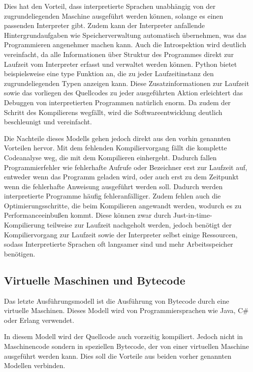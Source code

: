 \documentclass[11pt, parskip=half]{scrartcl}       %
\begin{document}
Dies hat den Vorteil, dass interpretierte Sprachen unabhängig von der zugrundeliegenden Maschine ausgeführt werden können, solange es einen passenden Interpreter gibt.
Zudem kann der Interpreter anfallende Hintergrundaufgaben wie Speicherverwaltung automatisch übernehmen, was das Programmieren angenehmer machen kann.
Auch die Introspektion wird deutlich vereinfacht, da alle Informationen über Struktur des Programmes direkt zur Laufzeit vom Interpreter erfasst und verwaltet werden können.
Python bietet beispielsweise eine type Funktion an, die zu jeder Laufzeitinstanz den zugrundeliegenden Typen anzeigen kann.
Diese Zusatzinformationen zur Laufzeit sowie das vorliegen des Quellcodes zu jeder ausgeführten Aktion erleichtert das Debuggen von interpretierten Programmen natürlich enorm.
Da zudem der Schritt des Kompilierens wegfällt, wird die Softwareentwicklung deutlich beschleunigt und vereinfacht.

Die Nachteile dieses Modells gehen jedoch direkt aus den vorhin genannten Vorteilen hervor.
Mit dem fehlenden Kompiliervorgang fällt die komplette Codeanalyse weg, die mit dem Kompilieren einhergeht.
Dadurch fallen Programmierfehler wie fehlerhafte Aufrufe oder Bezeichner erst zur Laufzeit auf, entweder wenn das Programm geladen wird, oder auch erst zu dem Zeitpunkt wenn die fehlerhafte Anweisung ausgeführt werden soll.
Dadurch werden interpretierte Programme häufig fehleranfälliger.
Zudem fehlen auch die Optimierungsschritte, die beim Kompilieren angewandt werden, wodurch es zu Performanceeinbußen kommt.
Diese können zwar durch Just-in-time-Kompilierung teilweise zur Laufzeit nachgeholt werden, jedoch benötigt der Kompiliervorgang zur Laufzeit sowie der Interpreter selbst einige Ressourcen, sodass Interpretierte Sprachen oft langsamer sind und mehr Arbeitsspeicher benötigen.

\subsection{Virtuelle Maschinen und Bytecode}

Das letzte Ausführungsmodell ist die Ausführung von Bytecode durch eine virtuelle Maschinen.
Dieses Modell wird von Programmiersprachen wie Java, C\# oder Erlang verwendet.

In diesem Modell wird der Quellcode auch vorzeitig kompiliert.
Jedoch nicht in Maschinencode sondern in speziellen Bytecode, der von einer virtuellen Maschine ausgeführt werden kann.
Dies soll die Vorteile aus beiden vorher genannten Modellen verbinden.
\end{document}
